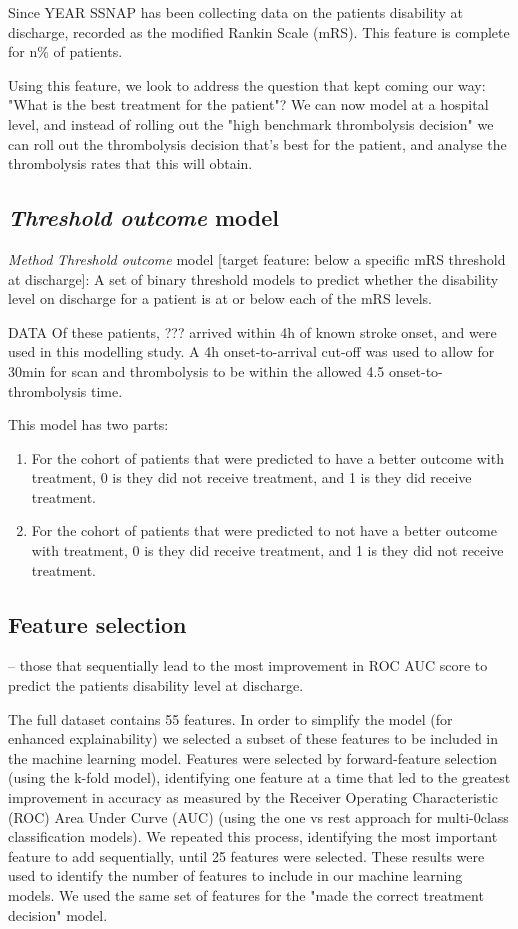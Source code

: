 Since YEAR SSNAP has been collecting data on the patients disability at discharge, recorded as the modified Rankin Scale (mRS). This feature is complete for n\% of patients.

Using this feature, we look to address the question that kept coming our way: "What is the best treatment for the patient"? We can now model at a hospital level, and instead of rolling out the "high benchmark thrombolysis decision" we can roll out the thrombolysis decision that's best for the patient, and analyse the thrombolysis rates that this will obtain.

\subsection{\textit{Threshold outcome} model}

\emph{Method}
\textit{Threshold outcome} model [target feature: below a specific mRS threshold at discharge]: A set of binary threshold models to predict whether the disability level on discharge for a patient is at or below each of the mRS levels. 

DATA
Of these patients, ??? arrived within 4h of known stroke onset, and were used in this modelling study. A 4h onset-to-arrival cut-off was used to allow for 30min for scan and thrombolysis to be within the allowed 4.5 onset-to-thrombolysis time.


 This model has two parts:
\begin{enumerate}
    \item For the cohort of patients that were predicted to have a better outcome with treatment, 0 is they did not receive treatment, and 1 is they did receive treatment.
    \item For the cohort of patients that were predicted to not have a better outcome with treatment, 0 is they did receive treatment, and 1 is they did not receive treatment.
\end{enumerate}



\subsection{Feature selection}
 – those that sequentially lead to the most improvement in ROC AUC score to predict the patients disability level at discharge. 

The full dataset contains 55 features. In order to simplify the model (for enhanced explainability) we selected a subset of these features to be included in the machine learning model. Features were selected by forward-feature selection (using the k-fold model), identifying one feature at a time that led to the greatest improvement in accuracy as measured by the Receiver Operating Characteristic (ROC) Area Under Curve (AUC) (using the one vs rest approach for multi-0class classification models). We repeated this process, identifying the most important feature to add sequentially, until 25 features were selected. These results were used to identify the number of features to include in our machine learning models. We used the same set of features for the "made the correct treatment decision" model.

